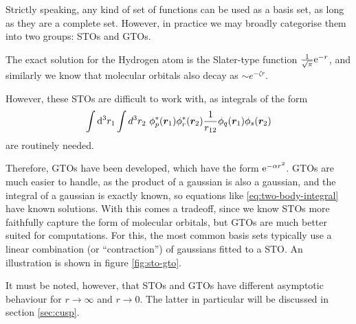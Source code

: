 Strictly speaking, any kind of set of functions can be used as a basis set, as long as they are a complete set. However, in practice we may broadly categorise them into two groups: \glspl{STO} and \glspl{GTO}.

The exact solution for the Hydrogen atom is the Slater-type function $\frac 1{\sqrt{\pi}} \mathrm{e}^{-r}$, and similarly we know that molecular orbitals also decay as $\sim e^{-\zeta r}$.

However, these \glspl{STO} are difficult to work with, as integrals of the form
\begin{equation}
    \label{eq:two-body-integral}
\int\mathrm{d}^3r_1\int d^3r_2\ \phi_p^*(\bm r_1)\phi_r^*(\bm r_2)\frac 1 {r_{12}}\phi_q(\bm r_1)\phi_s(\bm r_2)
\end{equation}
are routinely needed.

Therefore, \glspl{GTO} have been developed,\cite{boysElectronic1950} which have the form $\mathrm{e}^{-\alpha r^2}$. \glspl{GTO} are much easier to handle, as the product of a gaussian is also a gaussian, and the integral of a gaussian is exactly known, so equations like \ref{eq:two-body-integral} have known solutions. With this comes a tradeoff, since we know \glspl{STO} more faithfully capture the form of molecular orbitals, but \glspl{GTO} are much better suited for computations. For this, the most common basis sets typically use a linear combination (or ``contraction'') of gaussians fitted to a \gls{STO}. An illustration is shown in figure \ref{fig:sto-gto}.

It must be noted, however, that \glspl{STO} and \glspl{GTO} have different asymptotic behaviour for $r\to\infty$ and $r\to 0$. The latter in particular will be discussed in section \ref{sec:cusp}.


